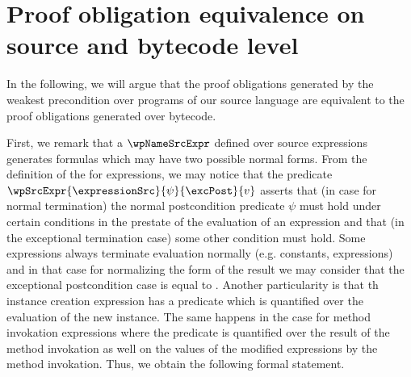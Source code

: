 

\newtheorem{wpExprSrc}{Lemma}[section]
\newtheorem{exprValueOnStack1}[wpExprSrc]{Lemma}
\newtheorem{exprSrcBcWp1}[wpExprSrc]{Lemma}
\newtheorem{exprSrcBcWp2}[wpExprSrc]{Lemma}
\newtheorem{wpStmtBcSrc1}[wpExprSrc]{Lemma}
\newtheorem{wpStmtBcSrc3}[wpExprSrc]{Lemma} %
\newtheorem{wpStmtBcSrc2}[wpExprSrc]{Lemma}
\newtheorem{theorem}{Theorem}[section]


\section{Proof obligation equivalence on source and bytecode level}\label{pogEq:aux}

In the following, we will argue that the proof obligations generated by the weakest precondition
over programs of our source language are equivalent to the  proof obligations generated over bytecode.

First, we remark that a $\wpNameSrcExpr$ defined over source  expressions generates formulas which may
 have two possible normal forms. From the definition of the \wpName{}  for expressions, we may notice that the predicate 
$\wpSrcExpr{\expressionSrc }{ \psi }{ \excPost}{v}$ asserts that  (in case for normal termination) the  normal postcondition
 predicate $\psi $ must hold under certain  conditions in the prestate of the evaluation of an expression and that
 (in the exceptional termination case) some other condition must hold. Some expressions always terminate evaluation normally
 (e.g. constants, \instanceof{} expressions) and in that case for normalizing the form of the \wpName{} result we may consider
that the exceptional postcondition case is equal to \Mytrue. Another particularity is that th instance creation
expression has a \wpName{} predicate which is quantified over the evaluation of the new instance. The same happens in the case
for method invokation expressions where the \wpName{} predicate is quantified over the result of the method invokation 
as well on the values of the modified expressions by the method invokation. 
Thus, we obtain the following formal statement.
 

